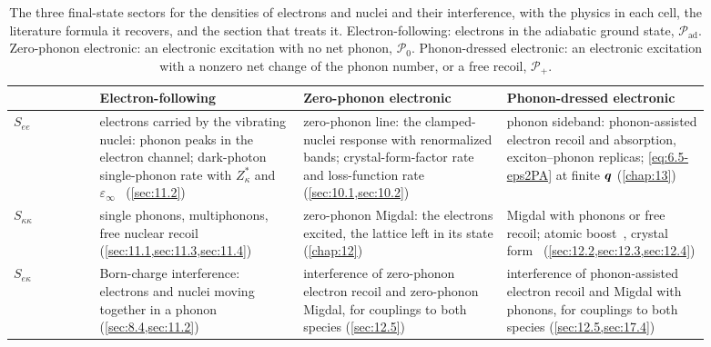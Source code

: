 \begin{table}[tbp]
  \centering
  \small
  \caption{The three final-state sectors for the densities of electrons and nuclei and their interference, with the physics in each cell, the literature formula it recovers, and the section that treats it. Electron-following: electrons in the adiabatic ground state, $\mathcal{P}_{\mathrm{ad}}$. Zero-phonon electronic: an electronic excitation with no net phonon, $\mathcal{P}_0$. Phonon-dressed electronic: an electronic excitation with a nonzero net change of the phonon number, or a free recoil, $\mathcal{P}_+$.}
  \label{tab:8-sectors}
  \begin{tabular}{@{}p{0.11\linewidth}p{0.26\linewidth}p{0.26\linewidth}p{0.26\linewidth}@{}}
    \toprule
    & Electron-following & Zero-phonon electronic & Phonon-dressed electronic \\
    \midrule
    $S_{ee}$ & electrons carried by the vibrating nuclei: phonon peaks in the electron channel; dark-photon single-phonon rate with $Z^*_\kappa$ and $\varepsilon_\infty$~\cite[Eqs.~(19)--(23)]{griffin2018directional} (\cref{sec:11.2}) & zero-phonon line: the clamped-nuclei response with renormalized bands; crystal-form-factor rate~\cite[Eq.~(3.13)]{essig2016direct} and loss-function rate~\cite[Eqs.~(6) and (13)]{knapen2021dark} (\cref{sec:10.1,sec:10.2}) & phonon sideband: phonon-assisted electron recoil and absorption, exciton--phonon replicas; \cref{eq:6.5-eps2PA} at finite $\bm{q}$ (\cref{chap:13}) \\
    \addlinespace
    $S_{\kappa\kappa}$ & single phonons, multiphonons, free nuclear recoil~\cite[Eqs.~(5)--(8)]{campbelldeem2020multiphonon} (\cref{sec:11.1,sec:11.3,sec:11.4}) & zero-phonon Migdal: the electrons excited, the lattice left in its state (\cref{chap:12}) & Migdal with phonons or free recoil; atomic boost~\cite[Eqs.~(55)--(58)]{ibe2018migdal}, crystal form~\cite[Eqs.~(3) and (6)]{knapen2021migdal} (\cref{sec:12.2,sec:12.3,sec:12.4}) \\
    \addlinespace
    $S_{e\kappa}$ & Born-charge interference: electrons and nuclei moving together in a phonon (\cref{sec:8.4,sec:11.2}) & interference of zero-phonon electron recoil and zero-phonon Migdal, for couplings to both species (\cref{sec:12.5}) & interference of phonon-assisted electron recoil and Migdal with phonons, for couplings to both species (\cref{sec:12.5,sec:17.4}) \\
    \bottomrule
  \end{tabular}
\end{table}

